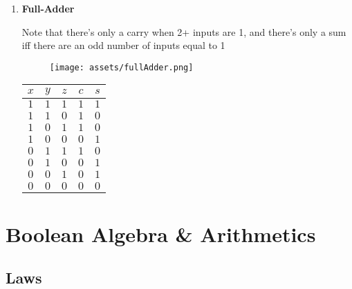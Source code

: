 \documentclass[english,course]{Notes}
\begin{document}
{\begin{enumerate}
\begin{minipage}{\linewidth}
\end{minipage}

\item \textbf{Full-Adder}
	
	
	\par{Note that there's only a carry when 2+ inputs are 1, and there's only a sum iff there are an odd number of inputs equal to 1}
	
	\begin{minipage}{\linewidth}
      \centering
      \begin{minipage}{0.65\linewidth}
          \begin{figure}[H]
              \texttt{[image: assets/fullAdder.png]}
          \end{figure}
      \end{minipage}
      \hspace{0.05\linewidth}
      \begin{minipage}{0.25\linewidth}
      \begin{tabular}{|c|c|c|c|c|}
		$x$ & $y$ & $z$ & $c$ & $s$  \\
		\hline
		$1$ & $1$ & $1$ &  $1$ & $1$ \\
		$1$ & $1$ & $0$ &  $1$ & $0$ \\
		$1$ & $0$ & $1$ &  $1$ & $0$ \\
		$1$ & $0$ & $0$ &  $0$ & $1$ \\ 
		$0$ & $1$ & $1$ &  $1$ & $0$ \\ 
		$0$ & $1$ & $0$ &  $0$ & $1$ \\
		$0$ & $0$ & $1$ &  $0$ & $1$ \\ 
		$0$ & $0$ & $0$ &  $0$ & $0$ \\
	\end{tabular}
	\end{minipage}
	
\end{minipage}
\end{enumerate}

\newpage
\section{Boolean Algebra \& Arithmetics}
\subsection{Laws}

}
\end{document}

